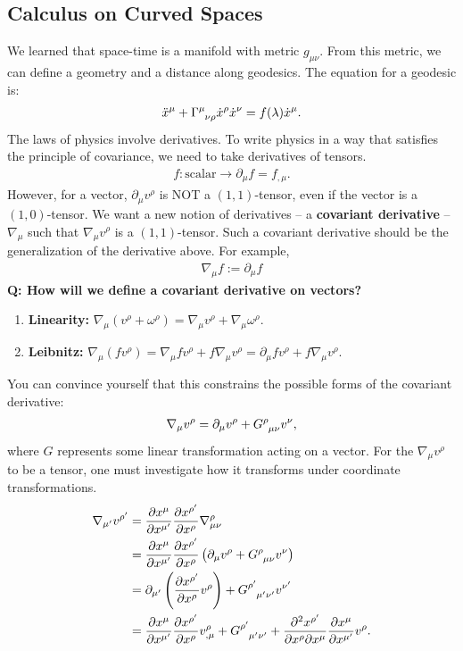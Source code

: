 \documentclass[11pt]{article}
\theoremstyle{definition}
\begin{document}
\subsection{Calculus on Curved Spaces}
We learned that space-time is a manifold with metric \( g_{\mu \nu} \). From this metric, we can define a geometry and a distance along geodesics. The equation for a geodesic is: 
\begin{align*}
	\ddot{x}^\mu + \tensor{\Gamma}{^\mu_{\nu \rho}} \dot{x}^\rho \dot{x}^\nu = f(\lambda) \dot{x}^\mu.
\end{align*}
The laws of physics involve derivatives. To write physics in a way that satisfies the principle of covariance, we need to take derivatives of tensors. 
\begin{align*}
	f: \text{scalar} \rightarrow \partial_\mu f = f_{, \mu}.
\end{align*}
However, for a vector, \( \partial_\mu v^\rho \) is NOT a \( (1,1)\)-tensor, even if the vector is a \( (1,0) \)-tensor. We want a new notion of derivatives -- a \textbf{covariant derivative} -- \( \nabla_\mu \) such that \( \nabla_\mu v^\rho \) is a \((1,1)\)-tensor. Such a covariant derivative should be the generalization of the derivative above. For example, 
\begin{align*}
	\nabla_\mu f := \partial_\mu f 
\end{align*}
\textbf{Q: How will we define a covariant derivative on vectors?}
\begin{enumerate}[noitemsep]
	\item \textbf{Linearity:} \( \nabla_\mu (v^\rho + \omega^\rho ) = \nabla_\mu v^\rho + \nabla_\mu \omega^\rho \).
	\item \textbf{Leibnitz:} \( \nabla_\mu (f v^\rho) = \nabla_\mu f v^\rho + f \nabla_\mu v^\rho = \partial_\mu f v^\rho + f \nabla_\mu v^\rho \).
\end{enumerate}
You can convince yourself that this constrains the possible forms of the covariant derivative: 
\begin{align*}
	\nabla_\mu v^\rho = \partial_\mu v^\rho + \tensor{G}{^\rho_{\mu \nu}} v^\nu, 
\end{align*}
where \( G \) represents some linear transformation acting on a vector. For the \( \nabla_\mu v^\rho \) to be a tensor, one must investigate how it transforms under coordinate transformations.
\begin{align*}
	\nabla_{\mu'} v^{\rho'} & = \frac{\partial x^\mu}{\partial x^{\mu'}} \frac{\partial x^{\rho'}}{\partial x^\rho} \nabla_{\mu \nu}^\rho \\
	& =  \frac{\partial x^\mu}{\partial x^{\mu'}} \frac{\partial x^{\rho'}}{\partial x^\rho} \left( \partial_\mu v^\rho + \tensor{G}{^\rho_{\mu \nu}} v^\nu  \right)  \\
	& = \partial_{\mu'} \left( \frac{\partial x^{\rho'}}{\partial x^\rho} v^\rho \right) + \tensor{G}{^{\rho'}_{\mu' \nu'}} v^{\nu'}\\
	& = \frac{\partial x^\mu}{\partial x^{\mu'}} \frac{\partial x^{\rho'}}{\partial x^\rho} v^\rho_{, \mu} + \tensor{G}{^{\rho'}_{\mu' \nu'}} + \frac{\partial^2 x^{\rho'}}{\partial x^\rho \partial x^{\mu}} \frac{\partial x^{\mu}}{\partial x^{\mu'}} v^\rho.
\end{align*}
\end{document}
